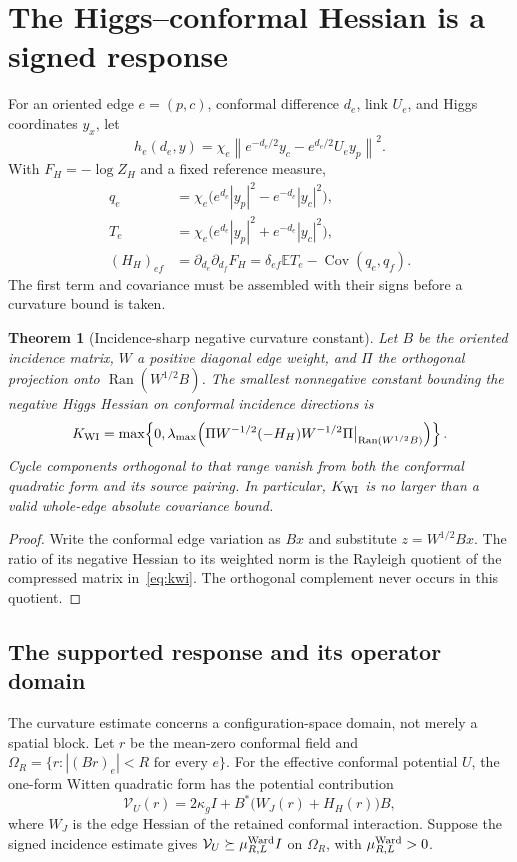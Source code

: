 \documentclass[11pt,a4paper,oneside]{book}
\theoremstyle{plain}
\newtheorem{theorem}{Theorem}[chapter]
\theoremstyle{definition}
\theoremstyle{remark}
\newcommand{\E}{\mathbb E}
\newcommand{\Cov}{\operatorname{Cov}}
\newcommand{\Ran}{\operatorname{Ran}}
\newcommand{\norm}[1]{\left\lVert#1\right\rVert}
\newcommand{\abs}[1]{\left\lvert#1\right\rvert}
\newcommand{\src}[2]{\cite{#1}}
\begin{document}
\section{The Higgs--conformal Hessian is a signed response}
For an oriented edge $e=(p,c)$, conformal difference $d_e$, link $U_e$, and Higgs coordinates $y_x$, let
\begin{equation}
 h_e(d_e,y)=\chi_e\norm{e^{-d_e/2}y_c-e^{d_e/2}U_ey_p}^2.
 \label{eq:hopping}
\end{equation}
With $F_H=-\log Z_H$ and a fixed reference measure,
\begin{align}
 q_e&=\chi_e\bigl(e^{d_e}|y_p|^2-e^{-d_e}|y_c|^2\bigr),\\
 T_e&=\chi_e\bigl(e^{d_e}|y_p|^2+e^{-d_e}|y_c|^2\bigr),\\
 (H_H)_{ef}&=\partial_{d_e}\partial_{d_f}F_H
 =\delta_{ef}\E T_e-\Cov(q_e,q_f).
 \label{eq:higgs-hessian}
\end{align}
The first term and covariance must be assembled with their signs before a curvature bound is taken.

\begin{theorem}[Incidence-sharp negative curvature constant]
\label{thm:incidence}
Let $B$ be the oriented incidence matrix, $W$ a positive diagonal edge weight, and $\Pi$ the orthogonal projection onto $\Ran(W^{1/2}B)$. The smallest nonnegative constant bounding the negative Higgs Hessian on conformal incidence directions is
\begin{equation}
 K_{\rm WI}=\max\!\left\{0,
 \lambda_{\max}\!\left(
 \Pi W^{-1/2}(-H_H)W^{-1/2}\Pi
 \big|_{\Ran(W^{1/2}B)}\right)\right\}.
 \label{eq:kwi}
\end{equation}
Cycle components orthogonal to that range vanish from both the conformal quadratic form and its source pairing. In particular, $K_{\rm WI}$ is no larger than a valid whole-edge absolute covariance bound.
\end{theorem}
\begin{proof}
Write the conformal edge variation as $Bx$ and substitute $z=W^{1/2}Bx$. The ratio of its negative Hessian to its weighted norm is the Rayleigh quotient of the compressed matrix in~\eqref{eq:kwi}. The orthogonal complement never occurs in this quotient.
\end{proof}
\src{R17}{thm:v17v99-optimal}\cite{R18}

\subsection{The supported response and its operator domain}
The curvature estimate concerns a configuration-space domain, not merely a
spatial block.  Let $r$ be the mean-zero conformal field and
$\Omega_R=\{r:\abs{(Br)_e}<R\text{ for every }e\}$.  For the effective
conformal potential $U$, the one-form Witten quadratic form has the
potential contribution
\[
 \mathcal V_U(r)=2\kappa_gI+B^*\bigl(W_J(r)+H_H(r)\bigr)B,
\]
where $W_J$ is the edge Hessian of the retained conformal interaction.
Suppose the signed incidence estimate gives
$\mathcal V_U\succeq\mu_{R,L}^{\rm Ward}I$ on $\Omega_R$, with
$\mu_{R,L}^{\rm Ward}>0$.
\end{document}

